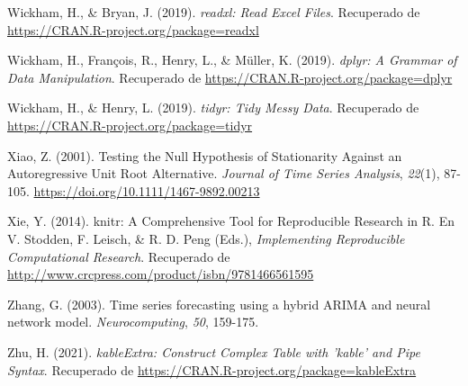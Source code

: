 \documentclass[
]{article}
\newlength{\cslhangindent}
\newlength{\cslentryspacingunit} %
\newenvironment{CSLReferences}[2] %
 {%
  \setlength{\parindent}{0pt}
  \ifodd #1
  \let\oldpar\par
  \def\par{\hangindent=\cslhangindent\oldpar}
  \fi
  \setlength{\parskip}{#2\cslentryspacingunit}
 }%
 {}
\begin{document}
\begin{CSLReferences}{1}{0}
\leavevmode{}%
Wickham, H., \& Bryan, J. (2019). \emph{readxl: Read Excel Files}.
Recuperado de \url{https://CRAN.R-project.org/package=readxl}

\leavevmode{}%
Wickham, H., François, R., Henry, L., \& Müller, K. (2019). \emph{dplyr:
A Grammar of Data Manipulation}. Recuperado de
\url{https://CRAN.R-project.org/package=dplyr}

\leavevmode{}%
Wickham, H., \& Henry, L. (2019). \emph{tidyr: Tidy Messy Data}.
Recuperado de \url{https://CRAN.R-project.org/package=tidyr}

\leavevmode{}%
Xiao, Z. (2001). Testing the Null Hypothesis of Stationarity Against an
Autoregressive Unit Root Alternative. \emph{Journal of Time Series
Analysis}, \emph{22}(1), 87-105.
\url{https://doi.org/10.1111/1467-9892.00213}

\leavevmode{}%
Xie, Y. (2014). knitr: A Comprehensive Tool for Reproducible Research in
{R}. En V. Stodden, F. Leisch, \& R. D. Peng (Eds.), \emph{Implementing
Reproducible Computational Research}. Recuperado de
\url{http://www.crcpress.com/product/isbn/9781466561595}

\leavevmode{}%
Zhang, G. (2003). Time series forecasting using a hybrid ARIMA and
neural network model. \emph{Neurocomputing}, \emph{50}, 159-175.

\leavevmode{}%
Zhu, H. (2021). \emph{kableExtra: Construct Complex Table with 'kable'
and Pipe Syntax}. Recuperado de
\url{https://CRAN.R-project.org/package=kableExtra}

\end{CSLReferences}
\end{document}

